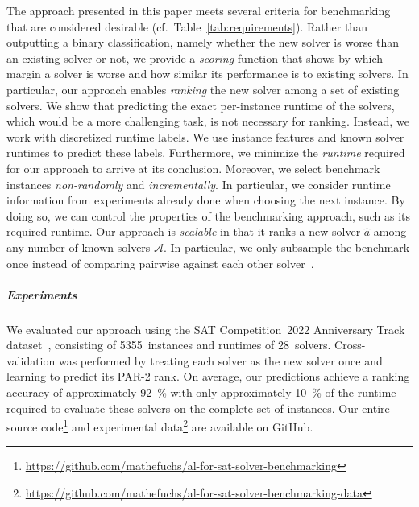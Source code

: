\documentclass[sn-basic, Numbered]{sn-jnl} %
\begin{document}
The approach presented in this paper meets several criteria for benchmarking that are considered desirable (cf.~Table~\ref{tab:requirements}).
Rather than outputting a binary classification, namely whether the new solver is worse than an existing solver or not, we provide a \emph{scoring} function that shows by which margin a solver is worse and how similar its performance is to existing solvers.
In particular, our approach enables \emph{ranking} the new solver among a set of existing solvers.
We show that predicting the exact per-instance runtime of the solvers, which would be a more challenging task, is not necessary for ranking.
Instead, we work with discretized runtime labels.
We use instance features and known solver runtimes to predict these labels.
Furthermore, we minimize the \emph{runtime} required for our approach to arrive at its conclusion.
Moreover, we select benchmark instances \emph{non-randomly} and \emph{incrementally}.
In particular, we consider runtime information from experiments already done when choosing the next instance.
By doing so, we can control the properties of the benchmarking approach, such as its required runtime.
Our approach is \emph{scalable} in that it ranks a new solver $\hat{a}$ among any number of known solvers $\mathcal{A}$.
In particular, we only subsample the benchmark once instead of comparing pairwise against each other solver~\cite{MatriconAFSH21}.

\subparagraph{Experiments}

We evaluated our approach using the SAT Competition~2022 Anniversary Track dataset~\cite{sat2022}, consisting of 5355~instances and runtimes of 28~solvers.
Cross-validation was performed by treating each solver as the new solver once and learning to predict its PAR-2 rank.
On average, our predictions achieve a ranking accuracy of approximately \SI{92}{\%} with only approximately \SI{10}{\%} of the runtime required to evaluate these solvers on the complete set of instances.
Our entire source code\footnote{\url{https://github.com/mathefuchs/al-for-sat-solver-benchmarking}} and experimental data\footnote{\url{https://github.com/mathefuchs/al-for-sat-solver-benchmarking-data}} are available on GitHub.
\end{document}
